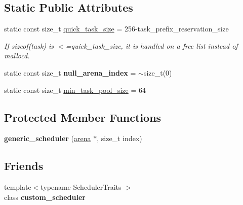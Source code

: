 \subsection*{Static Public Attributes}
\begin{DoxyCompactItemize}
\item 
\hypertarget{classtbb_1_1internal_1_1generic__scheduler_afbb75edc69c2ed1bcbf70098ca24a523}{}static const size\+\_\+t \hyperlink{classtbb_1_1internal_1_1generic__scheduler_afbb75edc69c2ed1bcbf70098ca24a523}{quick\+\_\+task\+\_\+size} = 256-\/task\+\_\+prefix\+\_\+reservation\+\_\+size\label{classtbb_1_1internal_1_1generic__scheduler_afbb75edc69c2ed1bcbf70098ca24a523}

\begin{DoxyCompactList}\small\item\em If sizeof(task) is $<$=quick\+\_\+task\+\_\+size, it is handled on a free list instead of malloc\textquotesingle{}d. \end{DoxyCompactList}\item 
\hypertarget{classtbb_1_1internal_1_1generic__scheduler_afae85a4245c85c65c3cd51e63125f23e}{}static const size\+\_\+t {\bfseries null\+\_\+arena\+\_\+index} = $\sim$size\+\_\+t(0)\label{classtbb_1_1internal_1_1generic__scheduler_afae85a4245c85c65c3cd51e63125f23e}

\item 
static const size\+\_\+t \hyperlink{classtbb_1_1internal_1_1generic__scheduler_a1190ee0529a9280846bd50c4f50c8398}{min\+\_\+task\+\_\+pool\+\_\+size} = 64
\end{DoxyCompactItemize}
\subsection*{Protected Member Functions}
\begin{DoxyCompactItemize}
\item 
\hypertarget{classtbb_1_1internal_1_1generic__scheduler_a6c2780fc1313fbd5c63c0ccee780d2e3}{}{\bfseries generic\+\_\+scheduler} (\hyperlink{classtbb_1_1internal_1_1arena}{arena} $\ast$, size\+\_\+t index)\label{classtbb_1_1internal_1_1generic__scheduler_a6c2780fc1313fbd5c63c0ccee780d2e3}

\end{DoxyCompactItemize}
\subsection*{Friends}
\begin{DoxyCompactItemize}
\item 
\hypertarget{classtbb_1_1internal_1_1generic__scheduler_a276a67d14225fdfbb225cc85299850e3}{}{\footnotesize template$<$typename Scheduler\+Traits $>$ }\\class {\bfseries custom\+\_\+scheduler}\label{classtbb_1_1internal_1_1generic__scheduler_a276a67d14225fdfbb225cc85299850e3}

\end{DoxyCompactItemize}


